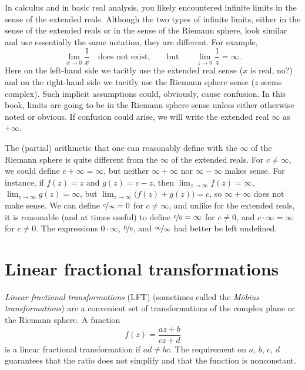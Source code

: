 \documentclass[12pt,openany]{book}
\newcommand{\myindex}[1]{#1\index{#1}}
\theoremstyle{plain}
\theoremstyle{remark}
\theoremstyle{definition}
\theoremstyle{exercise}
\theoremstyle{example}
\begin{document}
In calculus and in basic real analysis, you likely encountered
infinite limits in the sense of the extended reals.
Although the two types of infinite limits, either in the sense of the
extended reals or in the sense of the Riemann sphere,
look similar and use essentially the same notation,
they are different.
For example,
\begin{equation*}
\lim_{x \to 0} \frac{1}{x} \quad \text{does not exist,} \qquad \text{but} \qquad
\lim_{z \to 0} \frac{1}{z} = \infty .
\end{equation*}
Here on the left-hand side we tacitly use the extended real sense
($x$ is real, no?) and on the
right-hand side we tacitly use the Riemann sphere sense ($z$ seems complex).
Such implicit assumptions could, obviously, cause confusion.
In this book, limits are going to be in the Riemann sphere sense
unless either otherwise noted or obvious.
If confusion could arise, we will write the extended real $\infty$
as $+\infty$.

\medskip

The (partial) arithmetic that one can 
reasonably define with the $\infty$ of the Riemann sphere
is quite different from
the $\infty$ of the extended reals.
For $c \neq \infty$, we could define $c+\infty = \infty$,
but neither $\infty+\infty$ nor $\infty-\infty$ makes sense.
For instance, if $f(z) = z$ and $g(z) = c-z$,
then $\lim_{z \to \infty} f(z) = \infty$,
$\lim_{z \to \infty} g(z) = \infty$, but $\lim_{z \to \infty}
\bigl(f(z)+g(z)\bigr) = c$, so $\infty+\infty$ does not make sense.
We can define $\nicefrac{c}{\infty} = 0$ for $c \neq \infty$,
and unlike for the extended reals,
it is reasonable (and at times useful) to define $\nicefrac{c}{0} = \infty$ for
$c \neq 0$,
and $c \cdot \infty = \infty$ for $c \neq 0$.
The expressions $0 \cdot \infty$, $\nicefrac{0}{0}$, and
$\nicefrac{\infty}{\infty}$ had better be left undefined.


\section{Linear fractional transformations}

\emph{Linear fractional transformations}
(LFT)
(sometimes called the \emph{\myindex{M\"obius transformations}})
are a convenient set of transformations of the complex plane or the Riemann
sphere.
A function
\begin{equation*}
f(z) = \frac{a z + b}{c z + d}
\end{equation*}
is a linear fractional transformation if $ad \neq bc$.  The requirement on
$a$, $b$, $c$, $d$ guarantees that the ratio does not simplify and that the
function is nonconstant.
\end{document}
